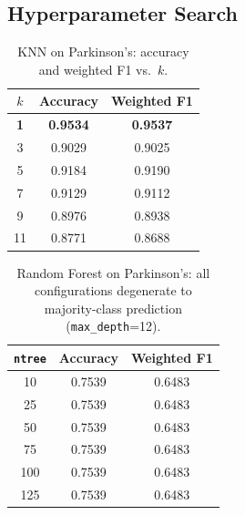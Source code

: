 \documentclass[11pt,letterpaper]{article}
\begin{document}
\subsection{Hyperparameter Search}

\begin{table}[ht]
\centering
\caption{KNN on Parkinson's: accuracy and weighted F1 vs.\ $k$.}
\label{tab:d2_knn}
\begin{tabular}{@{}ccc@{}}
\toprule
$k$ & Accuracy & Weighted F1 \\
\midrule
\rowcolor{hilight}
\textbf{1}  & \textbf{0.9534} & \textbf{0.9537} \\
3  & 0.9029 & 0.9025 \\
5  & 0.9184 & 0.9190 \\
7  & 0.9129 & 0.9112 \\
9  & 0.8976 & 0.8938 \\
11 & 0.8771 & 0.8688 \\
\bottomrule
\end{tabular}
\end{table}

\begin{table}[ht]
\centering
\caption{Random Forest on Parkinson's: all configurations degenerate to
         majority-class prediction (\texttt{max\_depth}=12).}
\label{tab:d2_rf}
\begin{tabular}{@{}ccc@{}}
\toprule
\texttt{ntree} & Accuracy & Weighted F1 \\
\midrule
10  & 0.7539 & 0.6483 \\
25  & 0.7539 & 0.6483 \\
50  & 0.7539 & 0.6483 \\
75  & 0.7539 & 0.6483 \\
100 & 0.7539 & 0.6483 \\
125 & 0.7539 & 0.6483 \\
\bottomrule
\end{tabular}
\end{table}
\end{document}

